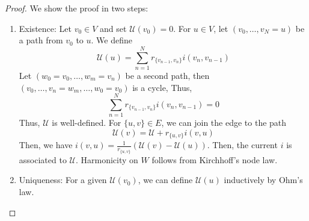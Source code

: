 \begin{proof}
    We show the proof in two steps:
    \begin{enumerate}[]
      \item Existence: Let \(v_0\in V\) and set \(\mathcal{U}(v_0)=0\). For \(u\in V\), let \((v_0,\dots, v_N=u)\) be a path from \(v_0\) to \(u\). We define \[\mathcal{U}(u)=\sum_{n=1}^{N}r_{\{v_{n-1},v_{n}\}}i(v_{n}, v_{n-1}) \]
        Let \((w_0=v_0, \dots, w_m=v_n)\) be a second path, then \((v_0, \dots, v_n=w_m, \dots, w_0=v_0)\) is a cycle, Thus, 
        \[\sum_{n=1}^{N} r_{\{v_{n-1},v_n\}} i(v_{n},v_{n-1})=0 \]
        Thus, \(\mathcal{U}\) is well-defined. For \(\{u,v\} \in E\), we can join the edge to the path \[\mathcal{U}(v) = \mathcal{U}+r_{\{u,v\}}i(v,u)\]
        Then, we have \(i(v,u) = \frac{1}{r_{\{u,v\}}} \left(\mathcal{U}(v)-\mathcal{U}(u)\right)\). Then, the current \(i\) is associated to \(\mathcal{U}\). Harmonicity on \(W\) follows from Kirchhoff's node law.
      \item Uniqueness: For a given \(\mathcal{U}(v_0)\), we can define \(\mathcal{U}(u)\) inductively by Ohm's law. 
    \end{enumerate}
    
\end{proof}

